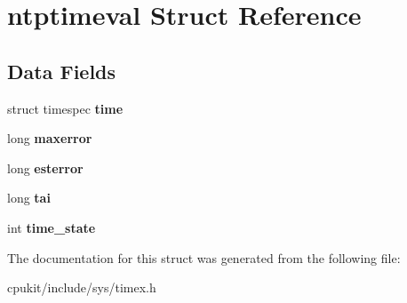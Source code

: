 \hypertarget{structntptimeval}{}\section{ntptimeval Struct Reference}
\label{structntptimeval}
\subsection*{Data Fields}
\begin{DoxyCompactItemize}
\item 
\mbox{\label{structntptimeval_a05f55917c533a01adc2e55233e647ed6}} 
struct timespec {\bfseries time}
\item 
\mbox{\label{structntptimeval_a9fd5b17716bfe5890aa4c6e273ccbce2}} 
long {\bfseries maxerror}
\item 
\mbox{\label{structntptimeval_a1ea37dc2b80494351bbf05c81d8b8a23}} 
long {\bfseries esterror}
\item 
\mbox{\label{structntptimeval_afdc98e421d4e8fea79f9a4c1d0f4525c}} 
long {\bfseries tai}
\item 
\mbox{\label{structntptimeval_a0cc3f21adb34aadeec3a49aadeccf9f6}} 
int {\bfseries time\+\_\+state}
\end{DoxyCompactItemize}


The documentation for this struct was generated from the following file\+:\begin{DoxyCompactItemize}
\item 
cpukit/include/sys/timex.\+h\end{DoxyCompactItemize}
